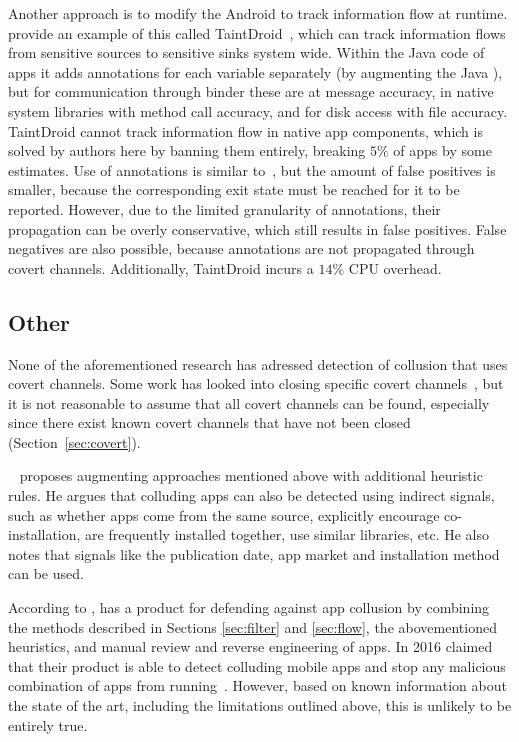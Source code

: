 \documentclass[article]{aaltoseries}
\newcommand{\Sref}[1]{Section~\ref{#1}}
\renewcommand\gls\cgls
\begin{document}
Another approach is to modify the Android \gls{os} to track information flow at runtime. \citeauthor{Enck2014} provide an example of this called TaintDroid~\cite{Enck2014}, which can track information flows from sensitive sources to sensitive sinks system wide. Within the Java code of apps it adds annotations for each variable separately (by augmenting the Java \gls{vm}), but for communication through binder these are at message accuracy, in native system libraries with method call accuracy, and for disk access with file accuracy. TaintDroid cannot track information flow in native app components, which is solved by authors here by banning them entirely, breaking $5\%$ of apps by some estimates. Use of annotations is similar to~\cite{Asavoae2018}, but the amount of false positives is smaller, because the corresponding exit state must be reached for it to be reported. However, due to the limited granularity of annotations, their propagation can be overly conservative, which still results in false positives. False negatives are also possible, because annotations are not propagated through covert channels. Additionally, TaintDroid incurs a $14\%$ CPU overhead.

\subsection{Other}
\label{sec:othermethods}

None of the aforementioned research has adressed detection of collusion that uses covert channels. Some work has looked into closing specific covert channels~\cite{nn2017,Qi2018}, but it is not reasonable to assume that all covert channels can be found, especially since there exist known covert channels that have not been closed (\Sref{sec:covert}).

\citeauthor{Muttik2016}~\cite{Muttik2016} proposes augmenting approaches mentioned above with additional heuristic rules. He argues that colluding apps can also be detected using indirect signals, such as whether apps come from the same source, explicitly encourage co-installation, are frequently installed together, use similar libraries, etc. He also notes that signals like the publication date, app market and installation method can be used. 

According to \citeauthor{Muttik2016}, \citeauthor{McAfee2016} has a product for defending against app collusion by combining the methods described in Sections \ref{sec:filter} and \ref{sec:flow}, the abovementioned heuristics, and manual review and reverse engineering of apps. In 2016 \citeauthor{McAfee2016} claimed that their product is able to detect colluding mobile apps and stop any malicious combination of apps from running~\cite{McAfee2016}. However, based on known information about the state of the art, including the limitations outlined above, this is unlikely to be entirely true.
\end{document}
